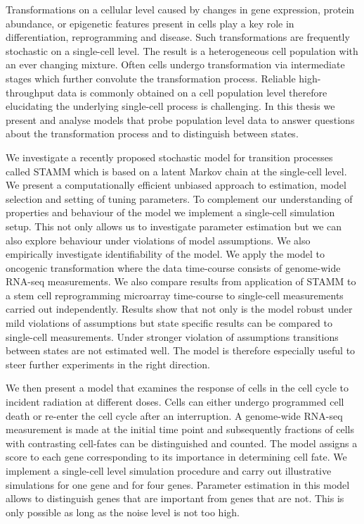 
\vspace{-1.5cm}
Transformations on a cellular level caused by changes in gene expression, protein abundance, or epigenetic features present in cells play a key role in differentiation, reprogramming and disease. Such transformations are frequently stochastic on a single-cell level. The result is a heterogeneous cell population with an ever changing mixture. Often cells undergo transformation via intermediate stages which further  convolute the transformation process. Reliable high-throughput data is commonly obtained on a cell population level therefore elucidating the underlying single-cell process is challenging. In this thesis we present and analyse models that probe population level data to answer questions about the transformation process and to distinguish between states.

We investigate a recently proposed stochastic model for transition processes called STAMM which is based on a latent Markov chain at the single-cell level. We present a computationally efficient unbiased approach to estimation, model selection and setting of tuning parameters. To complement our understanding of properties and behaviour of the model we implement a single-cell simulation setup. This not only allows us to investigate parameter estimation but we can also explore behaviour under violations of model assumptions. We also empirically investigate identifiability of the model. We apply the model to oncogenic transformation where the data time-course consists of genome-wide RNA-seq measurements. We also compare results from application of STAMM to a stem cell reprogramming microarray time-course to single-cell measurements carried out independently. Results show that not only is the model robust under mild violations of assumptions but state specific results can be compared to single-cell measurements. Under stronger violation of assumptions transitions between states are not estimated well. The model is therefore especially useful to steer further experiments in the right direction.

We then present  a model that examines the response of cells in the cell cycle to incident radiation at different doses. Cells can either undergo programmed cell death or re-enter the cell cycle after an interruption. A genome-wide RNA-seq measurement is made at the initial time point and subsequently fractions of cells with contrasting cell-fates can be distinguished and counted. The model assigns a score to each gene corresponding to its importance in determining cell fate. We implement a single-cell level simulation procedure and carry out illustrative simulations for one gene and for four genes. Parameter estimation in this model allows to distinguish genes that are important from genes that are not. This is only possible as long as the noise level is not too high.



